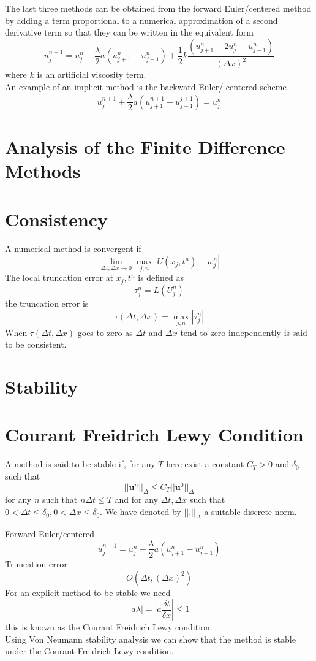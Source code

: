The last three methods can be obtained from the forward Euler/centered method by
adding a term proportional to a numerical approximation of a second derivative term so that they can be written in the equivalent form
\[ u^{n+1}_j=u^{n}_{j}-\frac{\lambda}{2}a(u^{n}_{j+1}-u^{n}_{j-1})+\frac{1}{2}k\frac{(u^{n}_{j+1}-2u_{j}^n+u^{n}_{j-1})}{(\Delta x)^2}\]
where $k$ is an artificial viscosity term.\\
An example of an implicit method is the backward Euler/ centered scheme
\[u^{n+1}_j+\frac{\lambda}{2}a(u_{j+1}^{n+1} - u_{j-1}^{j+1})=u_{j}^n \]

\section{Analysis of the Finite Difference Methods}
\section{Consistency}
A numerical method is convergent if 
\[\lim_{\Delta t,\Delta x \rightarrow 0} \max_{j,n}|U(x_j,t^n)-w_j^n| \] 
The local truncation error at $x_j,t^n$ is defined as
\[\tau_j^n = L(U^n_j) \]
the truncation error is 
\[\tau(\Delta t, \Delta x) = \max_{j,n}|\tau^n_j| \]
When $\tau(\Delta t, \Delta x)$ goes to zero as $\Delta t$ and $\Delta x$ tend to
zero independently is said to be consistent.
\section{Stability}
\section{Courant Freidrich Lewy Condition}
A method is said to be stable if, for any $T$ here exist a constant $C_T>0$
and $\delta_0$ such that
\[|| \mathbf{u}^n ||_{\Delta}\leq C_T ||\mathbf{u}^0||_{\Delta} \]
for any $n$ such that $n\Delta t \leq T$ and for any $\Delta t, \Delta x$ such that $0 < \Delta t \leq \delta_0,0 < \Delta x \leq \delta_0$. We have denoted by
$ 
|| . ||_{\Delta}$ a suitable discrete norm.

Forward Euler/centered
\[ u^{n+1}_j=u^{n}_{j}-\frac{\lambda}{2}a(u^{n}_{j+1}-u^{n}_{j-1})\]
Truncation error
\[O(\Delta t , (\Delta x)^2) \]
For an explicit method to be stable we need
\[|a\lambda| = \left|a\frac{\delta t}{\delta x}\right| \leq 1 \]
this is known as the Courant Freidrich Lewy condition.\\
Using  Von Neumann stability analysis we can show that the method is stable
under the Courant Freidrich Lewy condition.\\

